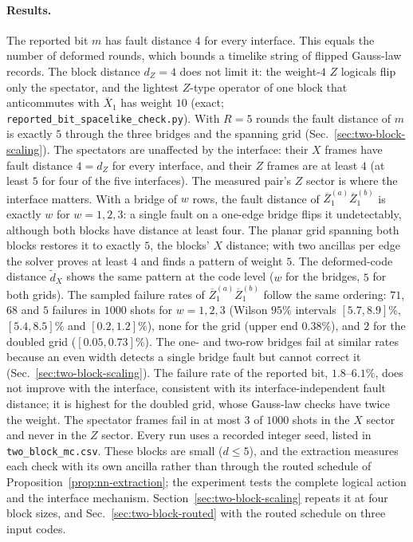 \documentclass[aps,prx,reprint,superscriptaddress,nofootinbib,floatfix,longbibliography]{revtex4-2}
\theoremstyle{definition}
\begin{document}
\paragraph{Results.}
The reported bit $m$ has fault distance $4$ for every interface.  This equals
the number of deformed rounds, which bounds a timelike string of flipped
Gauss-law records.  The block distance $d_Z=4$ does not limit it: the
weight-$4$ $Z$ logicals flip only the spectator, and the lightest $Z$-type
operator of one block that anticommutes with $\overline X_1$ has weight $10$
(exact; \texttt{reported\_bit\_spacelike\_check.py}).  With $R=5$ rounds the
fault distance of $m$ is exactly $5$ through the three bridges and the
spanning grid (Sec.~\ref{sec:two-block-scaling}).  The spectators are unaffected by
the interface: their $X$ frames have fault distance $4=d_Z$ for every
interface, and their $Z$ frames are at least $4$ (at least $5$ for four of the
five interfaces).  The measured pair's $Z$ sector is where the interface
matters.  With a bridge of $w$ rows, the fault distance of
$\overline Z_1^{(a)}\overline Z_1^{(b)}$ is exactly $w$ for $w=1,2,3$: a single
fault on a one-edge bridge flips it undetectably, although both blocks have
distance at least four.  The planar grid spanning both blocks restores it to
exactly $5$, the blocks' $X$ distance; with two ancillas per edge the solver
proves at least $4$ and finds a pattern of weight $5$.  The deformed-code
distance $\widetilde d_X$ shows the same pattern at the code level ($w$ for the
bridges, $5$ for both grids).  The sampled failure rates of
$\overline Z_1^{(a)}\overline Z_1^{(b)}$ follow the same ordering: $71$, $68$
and $5$ failures in $1000$ shots for $w=1,2,3$ (Wilson $95\%$ intervals
$[5.7,8.9]\%$, $[5.4,8.5]\%$ and $[0.2,1.2]\%$), none for the grid (upper end
$0.38\%$), and $2$ for the doubled grid ($[0.05,0.73]\%$).  The one- and
two-row bridges fail at similar rates because an even width detects a single
bridge fault but cannot correct it (Sec.~\ref{sec:two-block-scaling}).  The failure rate of the reported
bit, $1.8$--$6.1\%$, does not improve with the interface, consistent with its
interface-independent fault distance; it is highest for the doubled grid,
whose Gauss-law checks have twice the weight.  The spectator frames fail in at
most $3$ of $1000$ shots in the $X$ sector and never in the $Z$ sector.  Every
run uses a recorded integer seed, listed in \nolinkurl{two_block_mc.csv}.
These blocks are small ($d\le5$), and the extraction measures each check with
its own ancilla rather than through the routed schedule of
Proposition~\ref{prop:nn-extraction}; the experiment tests the complete
logical action and the interface mechanism.  Section~\ref{sec:two-block-scaling}
repeats it at four block sizes, and Sec.~\ref{sec:two-block-routed} with the
routed schedule on three input codes.
\end{document}
